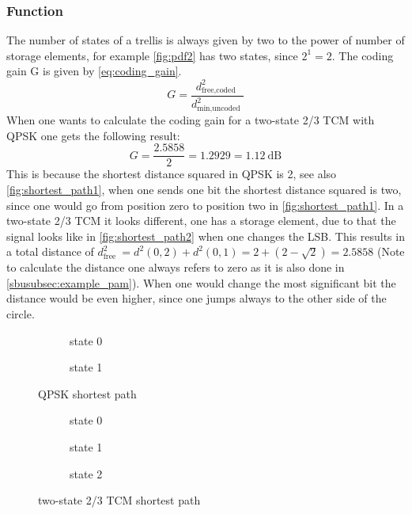 \subsubsection{Function}
The number of states of a trellis is always given by two to the power of number of storage elements, for example \autoref{fig:pdf2} has two states, since $2^1=2$. The coding gain G is given by \autoref{eq:coding_gain}.
\begin{equation}\label{eq:coding_gain}
G=\frac{d_{\text {free,coded }}^2}{d_{\text {min,uncoded }}^2}
\end{equation}
When one wants to calculate the coding gain for a two-state 2/3 TCM with QPSK one gets the following result:
$$
G=\frac{2.5858}{2}=1.2929=1.12 \mathrm{~dB}
$$
This is because the shortest distance squared in QPSK is 2, see also \autoref{fig:shortest_path1}, when one sends one bit the shortest distance squared is two, since one would go from position zero to position two in \autoref{fig:shortest_path1}. In a two-state 2/3 TCM it looks different, one has a storage element, due to that the signal looks like in \autoref{fig:shortest_path2} when one changes the LSB. This results in a total distance of $d_{\text {free }}^2=d^2(0,2)+d^2(0,1)=2+(2-\sqrt{2})=2.5858$ (Note to calculate the distance one always refers to zero as it is also done in \autoref{sbusubsec:example_pam}). When one would change the most significant bit the distance would be even higher, since one jumps always to the other side of the circle. 
\begin{figure}[ht]
    \begin{subfigure}[t]{0.3\linewidth}
        \caption{state 0}\label{subfig:qpsk}
    \end{subfigure}
 \hfil
    \begin{subfigure}[t]{0.3\linewidth}
        \caption{state 1}\label{subfig:8-psk}
    \end{subfigure}
    
\caption{QPSK shortest path}
\label{fig:shortest_path1}
\end{figure}
\begin{figure}[ht]
    \begin{subfigure}[t]{0.3\linewidth}
        \caption{state 0}\label{subfig:qpsk}
    \end{subfigure}
    \hfil
    \begin{subfigure}[t]{0.3\linewidth}
        \caption{state 1}\label{subfig:8-psk}
    \end{subfigure}
    \hfil
    \begin{subfigure}[t]{0.3\linewidth}
        \caption{state 2}\label{subfig:8-psk}
    \end{subfigure}
    
\caption{two-state 2/3 TCM shortest path}
\label{fig:shortest_path2}
\end{figure}

